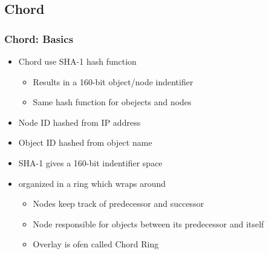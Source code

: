\subsection{Chord}
\begin{frame}
    \frametitle{Chord: Basics}
    \begin{itemize}
        \item Chord use SHA-1 hash function
        \begin{itemize}
            \item Results in a 160-bit object/node indentifier
            \item Same hash function for obejects and nodes
        \end{itemize}
        \item Node ID hashed from IP address
        \item Object ID hashed from object name \\

        \item SHA-1 gives a 160-bit indentifier space
        \item organized in a \alert{ring} which wraps around
        \begin{itemize}
            \item Nodes keep track of \alert{predecessor} and \alert{successor}
            \item Node responsible for objects between its predecessor and itself
            \item Overlay is ofen called \alert{Chord Ring}
        \end{itemize}
    \end{itemize}
\end{frame}

